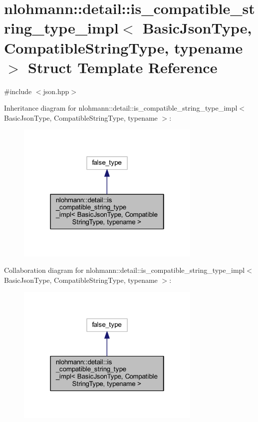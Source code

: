 \hypertarget{structnlohmann_1_1detail_1_1is__compatible__string__type__impl}{}\section{nlohmann\+::detail\+::is\+\_\+compatible\+\_\+string\+\_\+type\+\_\+impl$<$ Basic\+Json\+Type, Compatible\+String\+Type, typename $>$ Struct Template Reference}
\label{structnlohmann_1_1detail_1_1is__compatible__string__type__impl}


{\ttfamily \#include $<$json.\+hpp$>$}



Inheritance diagram for nlohmann\+::detail\+::is\+\_\+compatible\+\_\+string\+\_\+type\+\_\+impl$<$ Basic\+Json\+Type, Compatible\+String\+Type, typename $>$\+:
\nopagebreak
\begin{figure}[H]
\begin{center}
\leavevmode
\includegraphics[width=250pt]{structnlohmann_1_1detail_1_1is__compatible__string__type__impl__inherit__graph}
\end{center}
\end{figure}


Collaboration diagram for nlohmann\+::detail\+::is\+\_\+compatible\+\_\+string\+\_\+type\+\_\+impl$<$ Basic\+Json\+Type, Compatible\+String\+Type, typename $>$\+:
\nopagebreak
\begin{figure}[H]
\begin{center}
\leavevmode
\includegraphics[width=250pt]{structnlohmann_1_1detail_1_1is__compatible__string__type__impl__coll__graph}
\end{center}
\end{figure}


